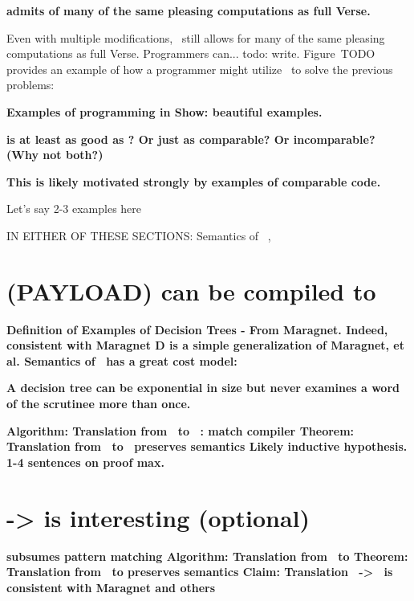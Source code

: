 \documentclass[manuscript,screen,review, 12pt]{acmart}
\begin{document}
\begin{outline}[enumerate]
     \bf{{\VMinus} admits of many of the same pleasing computations as full Verse. }
    
    Even with multiple modifications, \VMinus\ still allows for many of the same
    pleasing computations as full Verse. Programmers can... todo: write.
    Figure~TODO provides an example of how a programmer might utilize
    \VMinus\ to solve the previous problems:

     \bf{Examples of programming in \VMinus }
     \bf{Show: beautiful examples. }
   
   
     \bf{{\VMinus} is at least as good as {\PPlus}? Or just as comparable? }
        Or incomparable? (Why not both?)



     \bf{\bf{This is likely motivated strongly by examples of comparable code.}}

     Let's say 2-3 examples here

    \end{outline}

IN EITHER OF THESE SECTIONS: Semantics of \PPlus\ , \VMinus

\section{(PAYLOAD) {\VMinus} can be compiled to }
\begin{outline}[enumerate]
     \bf{Definition of \D }
     \bf{Examples of Decision Trees - From Maragnet. }
     \bf{Indeed, consistent with Maragnet }
     \bf{D is a simple generalization of Maragnet, et al. }
     \bf{Semantics of \D }
     \bf{\D\ has a great cost model: }

    \bf{A decision tree can be exponential in size but never examines a word of
    the scrutinee more than once. }

     \bf{Algorithm: Translation from \VMinus\ to \D\ : match compiler }
     \bf{Theorem: Translation from \VMinus\ to \D\ preserves semantics }
     \bf{Likely inductive hypothesis. 1-4 sentences on proof max. }
\end{outline}

\section{\PPlus -> \VMinus is interesting (optional)}
\begin{outline}[enumerate]
     \bf{\VMinus subsumes pattern matching }
     \bf{Algorithm: Translation from \PPlus\ to \VMinus}
     \bf{Theorem: Translation from \PPlus\ to \VMinus preserves semantics }
     \bf{Claim: Translation \PPlus\ -> \D\ is consistent with Maragnet and others}
\end{outline}
\end{document}

